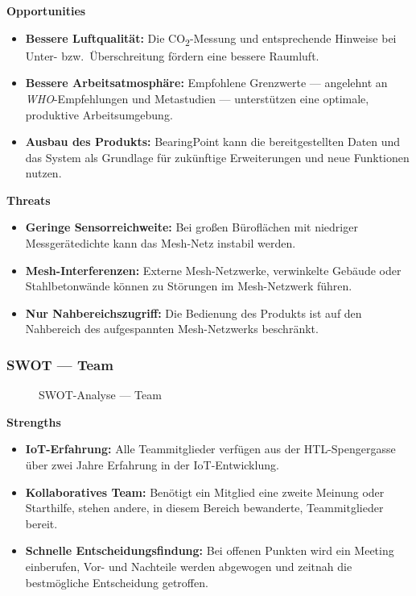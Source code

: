 \documentclass{article}
\begin{document}
\noindent\textbf{Opportunities}
\begin{itemize}
  \item \textbf{Bessere Luftqualität:} Die CO\textsubscript{2}-Messung und entsprechende Hinweise bei Unter- bzw.\ Überschreitung fördern eine bessere Raumluft.
  \item \textbf{Bessere Arbeitsatmosphäre:} Empfohlene Grenzwerte — angelehnt an \emph{WHO}-Empfehlungen und Metastudien — unterstützen eine optimale, produktive Arbeitsumgebung.
  \item \textbf{Ausbau des Produkts:} BearingPoint kann die bereitgestellten Daten und das System als Grundlage für zukünftige Erweiterungen und neue Funktionen nutzen.
\end{itemize}

\noindent\textbf{Threats}
\begin{itemize}
  \item \textbf{Geringe Sensorreichweite:} Bei großen Büroflächen mit niedriger Messgerätedichte kann das Mesh-Netz instabil werden.
  \item \textbf{Mesh-Interferenzen:} Externe Mesh-Netzwerke, verwinkelte Gebäude oder Stahlbetonwände können zu Störungen im Mesh-Netzwerk führen.
  \item \textbf{Nur Nahbereichszugriff:} Die Bedienung des Produkts ist auf den Nahbereich des aufgespannten Mesh-Netzwerks beschränkt.
\end{itemize}


\subsubsection{SWOT — Team}
\begin{figure}[H]
  \centering
  
  \caption{SWOT-Analyse — Team}
  \label{fig:swot-team}
\end{figure}

\noindent\textbf{Strengths}
\begin{itemize}
  \item \textbf{IoT-Erfahrung:} Alle Teammitglieder verfügen aus der HTL-Spengergasse über zwei Jahre Erfahrung in der IoT-Entwicklung.
  \item \textbf{Kollaboratives Team:} Benötigt ein Mitglied eine zweite Meinung oder Starthilfe, stehen andere, in diesem Bereich bewanderte, Teammitglieder bereit.
  \item \textbf{Schnelle Entscheidungsfindung:} Bei offenen Punkten wird ein Meeting einberufen, Vor- und Nachteile werden abgewogen und zeitnah die bestmögliche Entscheidung getroffen.
\end{itemize}
\end{document}
